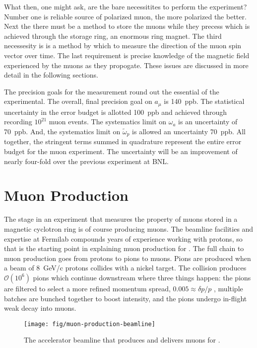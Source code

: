 What then, one might ask, are the bare necessitites to perform the \gmtwo experiment?  Number one is reliable source of polarized muon, the more polarized the better.  Next the there must be a method to store the muons while they precess which is achieved through the \gmtwo storage ring, an enormous ring magnet.  The third necessesity is is a method by which to measure the direction of the muon spin vector over time.  The last requirement is precise knowledge of the magnetic field experienced by the muons as they propogate.  These issues are discussed in more detail in the following sections.

The precision goals for the measurement round out the essential of the experimental.  The overall, final precision goal on $a_\mu$ is \SI{140}{ppb}.  The statistical uncertainty in the error budget is allotted \SI{100}{ppb} and achieved through recording $10^21$ muon events.  The systematics limit on $\omega_a$ is an uncertainty of \SI{70}{ppb}.  And, the systematics limit on $\tilde{\omega}_p$ is allowed an uncertainty \SI{70}{ppb}.  All together, the stringent terms summed in quadrature represent the entire error budget for the muon \gmtwo experiment.  The uncertainty will be an improvement of nearly four-fold over the previous experiment at BNL.

\section{Muon Production}

The stage in an experiment that measures the property of muons stored in a magnetic cyclotron ring is of course producing muons.  The beamline facilities and expertise at Fermilab compounds years of experience working with protons, so that is the starting point in explaining muon production for \gmtwo.  The full chain to muon production goes from protons to pions to muons.  Pions are produced when a beam of \SI{8}{\GeV/c} protons collides with a nickel target.  The collision produces $\mathcal{O}(10^6)$ pions which continue downstream where three things happen: the pions are filtered to select a more refined momentum spread, $0.005\approx\delta p / p$ , multiple batches are bunched together to boost intensity, and the pions undergo in-flight weak decay into muons.

\begin{figure}
\label{fig:muon-production-beamline}
\texttt{[image: fig/muon-production-beamline]}
\caption{The accelerator beamline that produces and delivers muons for \gmtwo. }
\end{figure}

